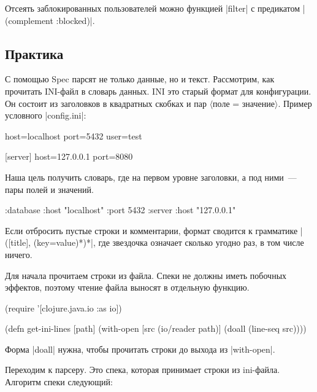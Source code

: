 Отсеять заблокированных пользователей можно функцией \spverb|filter| с
предикатом \spverb|(complement :blocked)|.

\subsection{Практика}

С помощью Spec парсят не только данные, но и текст. Рассмотрим, как прочитать
INI-файл в словарь данных. INI
это старый формат для конфигурации. Он состоит из заголовков в квадратных
скобках и пар $\langle$поле = значение$\rangle$. Пример условного
\spverb|config.ini|:

\begin{english}
  \begin{ini}
[database]
host=localhost
port=5432
user=test

[server]
host=127.0.0.1
port=8080
  \end{ini}
\end{english}

Наша цель получить словарь, где на первом уровне заголовки, а под ними~--- пары
полей и значений.

\begin{english}
  \begin{clojure}
{:database {:host "localhost"
            :port 5432}
 :server {:host "127.0.0.1"}}
  \end{clojure}
\end{english}

Если отбросить пустые строки и комментарии, формат сводится к грамматике
\spverb|([title], (key=value)*)*|, где звездочка означает сколько угодно раз, в
том числе ничего.

Для начала прочитаем строки из файла. Спеки не должны иметь побочных эффектов,
поэтому чтение файла выносят в отдельную функцию.

\begin{english}
  \begin{clojure}
(require '[clojure.java.io :as io])

(defn get-ini-lines [path]
  (with-open [src (io/reader path)]
    (doall (line-seq src))))
  \end{clojure}
\end{english}

Форма \spverb|doall| нужна, чтобы прочитать строки до выхода из \spverb|with-open|.

Переходим к парсеру. Это спека, которая принимает строки из ini-файла. Алгоритм
спеки следующий:

